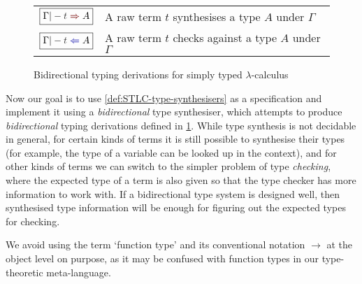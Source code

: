 \begin{figure}
  \small
  \bgroup
  \renewcommand{\arraystretch}{1.5}
  \begin{tabular}{ r l }
    $\boxed{\Gamma |- \isTerm{t} \syn A}$ & A raw term $t$ synthesises a type $A$ under $\Gamma$ \\
    $\boxed{\Gamma |- \isTerm{t} \chk A}$ &A raw term $t$ checks against a type $A$ under $\Gamma$
  \end{tabular}
  \egroup
  \centering
  \caption{Bidirectional typing derivations for simply typed $\lambda$-calculus}
  \label{fig:STLC-bidirectional-typing-derivations}
\end{figure}

Now our goal is to use \cref{def:STLC-type-synthesisers} as a specification and implement it using a \emph{bidirectional} type synthesiser, which attempts to produce \emph{bidirectional} typing derivations defined in \cref{fig:STLC-bidirectional-typing-derivations}.
While type synthesis is not decidable in general, for certain kinds of terms it is still possible to synthesise their types (for example, the type of a variable can be looked up in the context), and for other kinds of terms we can switch to the simpler problem of type \emph{checking}, where the expected type of a term is also given so that the type checker has more information to work with.
If a bidirectional type system is designed well, then synthesised type information will be enough for figuring out the expected types for checking.

\begin{remark}
  We avoid using the term `function type' and its conventional notation $\to$ at the object level on purpose, as it may be confused with function types in our type-theoretic meta-language.
\end{remark}

